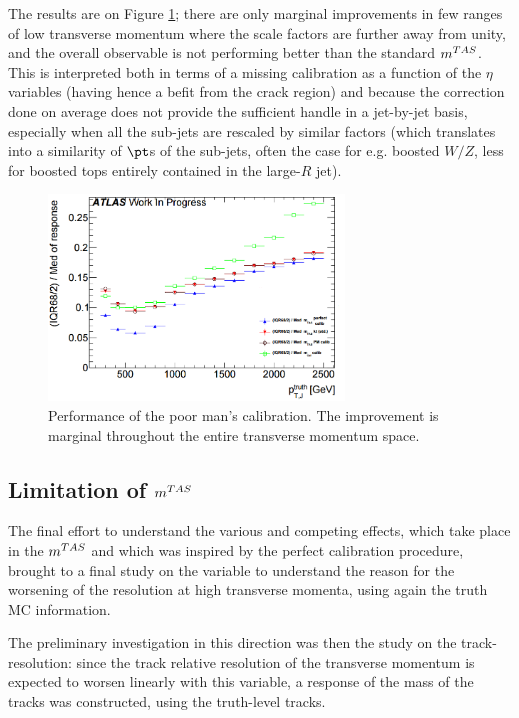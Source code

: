 The results are on Figure \ref{fig:perfcalib4}; there are only marginal improvements in few ranges of low transverse momentum where the scale factors are further away from unity, and the overall observable is not performing better than the standard $m^{TAS}$. This is interpreted both in terms of a missing calibration as a function of the $\eta$ variables (having hence a befit from the crack region) and because the correction done on average does not provide the sufficient handle in a jet-by-jet basis, especially when all the sub-jets are rescaled by similar factors (which translates into a similarity of $\pt$s of the sub-jets, often the case for e.g. boosted $W/Z$, less for boosted tops entirely contained in the large-$R$ jet).

\begin{figure}[!ht]
  \centering
      \includegraphics[width=0.7\textwidth]{jet_part/calib/perfectcalib4.png}
  \caption[Simple calibration]{Performance of the poor man's calibration. The improvement is marginal throughout the entire transverse momentum space.}
  \label{fig:perfcalib4}
\end{figure}

\subsection{Limitation of $m^{TAS}$}
The final effort to understand the various and competing effects, which take place in the $m^{TAS}$ and which was inspired by the perfect calibration procedure, brought to a final study on the variable to understand the reason for the worsening of the resolution at high transverse momenta, using again the truth MC information.

The preliminary investigation in this direction was then the study on the track-resolution: since the track relative resolution of the transverse momentum is expected to worsen linearly with this variable, a response of the mass of the tracks was constructed, using the truth-level tracks.

